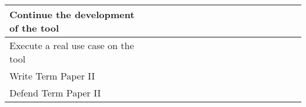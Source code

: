 \begin{table}
{\begin{tabular}{|l|l|l|l|l|l|l|l|l|l|l|l|l|l|l|l|l|}
      \hline
      Continue the development of the tool                               &                                      &                                      &                                      &                                      &                                      &                                      &                                      &                                      &                                      &                                      & {\cellcolor[rgb]{0.753,0.753,0.753}} & {\cellcolor[rgb]{0.753,0.753,0.753}} & {\cellcolor[rgb]{0.753,0.753,0.753}} & {\cellcolor[rgb]{0.753,0.753,0.753}} &                                      &                                      \\
      \hline
      Execute a real use case on the tool                                &                                      &                                      &                                      &                                      &                                      &                                      &                                      &                                      &                                      &                                      &                                      &                                      &                                      & {\cellcolor[rgb]{0.753,0.753,0.753}} & {\cellcolor[rgb]{0.753,0.753,0.753}} &                                      \\
      \hline
      Write Term Paper II                                                &                                      &                                      &                                      &                                      &                                      &                                      &                                      &                                      &                                      &                                      &                                      &                                      &                                      & {\cellcolor[rgb]{0.753,0.753,0.753}} & {\cellcolor[rgb]{0.753,0.753,0.753}} & {\cellcolor[rgb]{0.753,0.753,0.753}} \\
      \hline
      Defend Term Paper II                                               &                                      &                                      &                                      &                                      &                                      &                                      &                                      &                                      &                                      &                                      &                                      &                                      &                                      &                                      &                                      & {\cellcolor[rgb]{0.753,0.753,0.753}} \\
      \hline
    \end{tabular}
  }
\end{table}